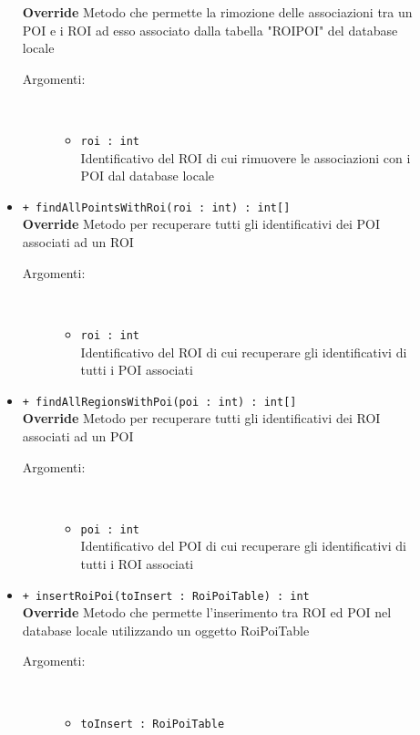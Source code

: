 \documentclass[../DefinizioneDiProdotto.tex]{subfiles}
\begin{document}
\begin{description}
\begin{itemize}
\textbf{Override} Metodo che permette la rimozione delle associazioni tra un POI e i ROI ad esso associato dalla tabella "ROIPOI" del database locale 
 \begin{description}
\item[Argomenti:] \
\begin{itemize}
\item \texttt{roi : int}\\
Identificativo del ROI di cui rimuovere le associazioni con i POI dal database locale\end{itemize}
\end{description}
\item \texttt{+ findAllPointsWithRoi(roi : int) : int[]}\\
\textbf{Override} Metodo per recuperare tutti gli identificativi dei POI associati ad un ROI 
 \begin{description}
\item[Argomenti:] \
\begin{itemize}
\item \texttt{roi : int}\\
Identificativo del ROI di cui recuperare gli identificativi di tutti i POI associati\end{itemize}
\end{description}
\item \texttt{+ findAllRegionsWithPoi(poi : int) : int[]}\\
\textbf{Override} Metodo per recuperare tutti gli identificativi dei ROI associati ad un POI 
 \begin{description}
\item[Argomenti:] \
\begin{itemize}
\item \texttt{poi : int}\\
Identificativo del POI di cui recuperare gli identificativi di tutti i ROI associati\end{itemize}
\end{description}
\item \texttt{+ insertRoiPoi(toInsert : RoiPoiTable) : int}\\
\textbf{Override} Metodo che permette l'inserimento tra ROI ed POI nel database locale utilizzando un oggetto RoiPoiTable
 \begin{description}
\item[Argomenti:] \
\begin{itemize}
\item \texttt{toInsert : RoiPoiTable}\\

\end{itemize}
\end{description}
\end{itemize}
\end{description}
\end{document}
